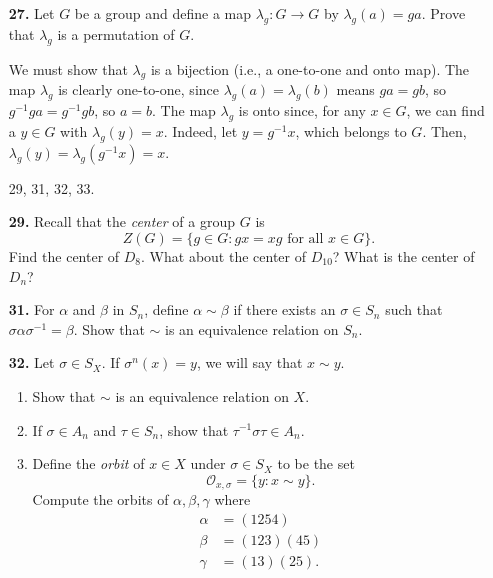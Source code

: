 \documentclass[12pt,reqno]{amsart}
\newcommand{\boldemph}{\emph}
\newcommand{\<}{\ensuremath{\langle}}
\renewcommand{\>}{\ensuremath{\rangle}}
\newcommand{\probskip}{\vskip8cm}
\begin{document}
\begin{enumerate}[{\bf 1.}]
\item[{\bf 27.}] 
Let $G$ be a group and define a map $\lambda_g : G \rightarrow G$ by
$\lambda_g(a) = g a$.  Prove that $\lambda_g$ is a permutation of $G$.
\bigskip

 We must show that 
$\lambda_g$ is a bijection (i.e., a one-to-one and onto map).
The map $\lambda_g$ is clearly one-to-one, since $\lambda_g(a) = \lambda_g(b)$
means $ga = gb$, so $g^{-1}ga = g^{-1}gb$, so $a = b$.
The map $\lambda_g$ is onto since, for any $x\in G$, we can find a $y \in G$
with $\lambda_g(y) = x$.  Indeed, let $y = g^{-1}x$, which belongs to $G$. Then,
$\lambda_g(y) =\lambda_g(g^{-1}x) = x$.

\renewcommand{\probskip}{\vskip1cm}

\probskip

 29, 31, 32, 33.  
\\

\item[{\bf 29.}]  %
Recall that the \boldemph{center} of a group $G$ is
\[
Z(G) = \{ g \in G : \mbox{$gx = xg$ for all $x \in G$} \}.
\]
Find the center of $D_8$. What about the center of $D_{10}$? What is
the center of $D_n$? 
 
\probskip

 
\item[{\bf 31.}]  %
For $\alpha$ and $\beta$ in $S_n$, define $\alpha \sim \beta$ if there
exists an $\sigma \in S_n$ such that 
$\sigma \alpha \sigma^{-1} = \beta$.  Show that $\sim$ is an equivalence
relation on $S_n$. 
 
\probskip
 
\item[{\bf 32.}]  %
Let $\sigma \in S_X$. If $\sigma^n(x) = y$, we will say that 
$x \sim y$. 
\begin{enumerate}
 
 \item
Show that $\sim$ is an equivalence relation on $X$.
 
 \item
If $\sigma \in A_n$ and $\tau \in S_n$, show that 
$\tau^{-1} \sigma \tau \in A_n$. 
 
\item
Define the \boldemph{orbit} of $x \in X$ under $\sigma \in S_X$ to
be the set  
\[
{\mathcal O}_{x, \sigma} = \{ y : x \sim y  \}.
\]
Compute the orbits of $\alpha, \beta, \gamma$ where
\begin{align*}
\alpha & = (1254) \\
\beta & = (123)(45)\\
\gamma & = (13)(25).
\end{align*}
 

\end{enumerate}
\end{enumerate}
\end{document}
